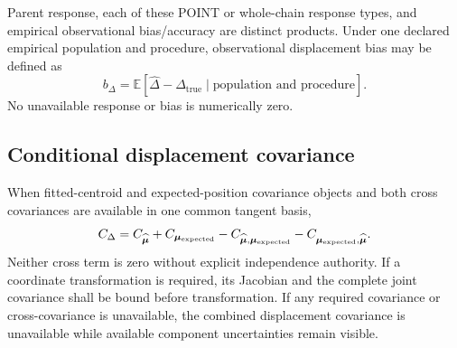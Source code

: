 Parent response, each of these POINT or whole-chain response types, and
empirical observational bias/accuracy are distinct products. Under one declared
empirical population and procedure, observational displacement bias may be
defined as
\begin{equation}
b_{\Delta}=\mathbb{E}\!\left[
\widehat{\Delta}-\Delta_{\mathrm{true}}
\mid \text{population and procedure}\right].
\label{eq:observational-bias}
\end{equation}
No unavailable response or bias is numerically zero.

\subsection{Conditional displacement covariance}\label{sec:displacement-covariance}

When fitted-centroid and expected-position covariance objects and both cross
covariances are available in one common tangent basis,
\begin{equation}
C_{\Delta}=C_{\widehat{\boldsymbol{\mu}}}+C_{\boldsymbol{\mu}_{\mathrm{expected}}}
-C_{\widehat{\boldsymbol{\mu}},\boldsymbol{\mu}_{\mathrm{expected}}}-C_{\boldsymbol{\mu}_{\mathrm{expected}},\widehat{\boldsymbol{\mu}}}.
\label{eq:displacement-covariance}
\end{equation}
Neither cross term is zero without explicit independence authority. If a
coordinate transformation is required, its Jacobian and the complete joint
covariance shall be bound before transformation. If any required covariance
or cross-covariance is unavailable, the combined displacement covariance is
unavailable while available component uncertainties remain visible.
